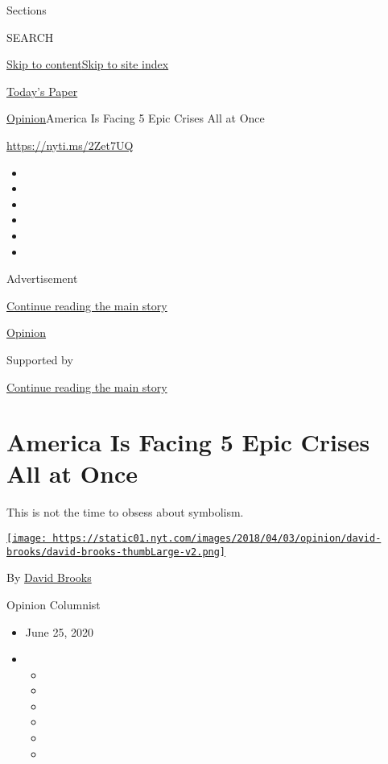 Sections

SEARCH

\protect\hyperlink{site-content}{Skip to
content}\protect\hyperlink{site-index}{Skip to site index}

\href{https://myaccount.nytimes.com/auth/login?response_type=cookie\&client_id=vi}{}

\href{https://www.nytimes.com/section/todayspaper}{Today's Paper}

\href{/section/opinion}{Opinion}\textbar{}America Is Facing 5 Epic
Crises All at Once

\href{https://nyti.ms/2Zet7UQ}{https://nyti.ms/2Zet7UQ}

\begin{itemize}
\item
\item
\item
\item
\item
\item
\end{itemize}

Advertisement

\protect\hyperlink{after-top}{Continue reading the main story}

\href{/section/opinion}{Opinion}

Supported by

\protect\hyperlink{after-sponsor}{Continue reading the main story}

\hypertarget{america-is-facing-5-epic-crises-all-at-once}{%
\section{America Is Facing 5 Epic Crises All at
Once}\label{america-is-facing-5-epic-crises-all-at-once}}

This is not the time to obsess about symbolism.

\href{https://www.nytimes.com/by/david-brooks}{\texttt{[image: https://static01.nyt.com/images/2018/04/03/opinion/david-brooks/david-brooks-thumbLarge-v2.png]}}

By \href{https://www.nytimes.com/by/david-brooks}{David Brooks}

Opinion Columnist

\begin{itemize}
\item
  June 25, 2020
\item
  \begin{itemize}
  \item
  \item
  \item
  \item
  \item
  \item
  \end{itemize}
\end{itemize}


